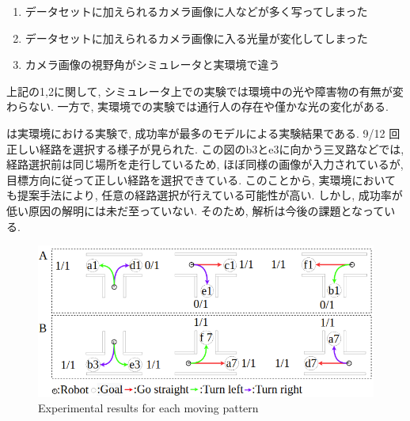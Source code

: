 \begin{enumerate}
  \item データセットに加えられるカメラ画像に人などが多く写ってしまった
  \item データセットに加えられるカメラ画像に入る光量が変化してしまった
  \item カメラ画像の視野角がシミュレータと実環境で違う
\end{enumerate}

上記の1,2に関して, シミュレータ上での実験では環境中の光や障害物の有無が変わらない. 一方で, 実環境での実験では通行人の存在や僅かな光の変化がある. 
\par
{}は実環境における実験で, 成功率が最多のモデルによる実験結果である. 9/12 回正しい経路を選択する様子が見られた. この図のb3とe3に向かう三叉路などでは, 経路選択前は同じ場所を走行しているため, ほぼ同様の画像が入力されているが, 目標方向に従って正しい経路を選択できている. このことから, 実環境においても提案手法により, 任意の経路選択が行えている可能性が高い.
しかし, 成功率が低い原因の解明には未だ至っていない. そのため, 解析は今後の課題となっている.

\begin{figure}[hbtp]
  \centering
 \includegraphics[keepaspectratio, scale=0.5]
      {images/real_model3.png}
 \caption{Experimental results for each moving pattern}
 \label{Fig:real_model3}
\end{figure}

\newpage
